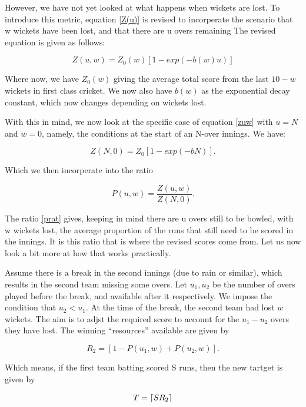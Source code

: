 However, we have not yet looked at what happens when wickets are lost. To introduce this metric, equation \ref{Z(u)}
is revised to incorperate the scenario that w wickets have been lost, and that there are u overs remaining
The revised equation is given as follows:

\begin{equation}
    Z(u,w) = Z_0(w)[1-exp(-b(w)u)]
    \label{zuw}
\end{equation}

Where now, we have $Z_0(w)$ giving the average total score from the last $10-w$ wickets in first class cricket.
We now also have $b(w)$ as the exponential decay constant, which now changes depending on wickets lost.

With this in mind, we now look at the specific case of equation \ref{zuw} with $u=N$ and $w=0$, namely, the conditions
at the start of an N-over innings. We have:

\begin{equation}
    Z(N,0) = Z_0[1-exp(-bN)].
    \label{zstart}
\end{equation}

Which we then incorperate into the ratio

\begin{equation}
    P(u,w) = \frac{Z(u,w)}{Z(N,0)}.
    \label{prat}
\end{equation}

The ratio \ref{prat} gives, keeping in mind there are u overs still to be bowled, with w wickets
lost, the average proportion of the runs that still need to be scored in the innings. 
It is this ratio that is where the revised scores come from. Let us now look a bit more at how that works
practically.

\begin{example}
    \label{dlExMain}
    Assume there is a break in the second innings (due to rain or similar), which results in the second team missing some overs.
    Let $u_1, u_2$ be the number of overs played before the break, and available after it respectively. We impose the condition
    that $u_2 < u_1$. At the time of the break, the second team had lost $w$ wickets. The aim is to adjst the required score to account
    for the $u_1 - u_2$ overs they have lost. The winning ``resources'' available are given by

    \[
        R_2 = [1-P(u_1,w)+P(u_2,w)].
    \]  

    Which means, if the first team batting scored S runs, then the new tartget is given by

    \[
        T = \lceil SR_2\rceil
    \]  
\end{example}

